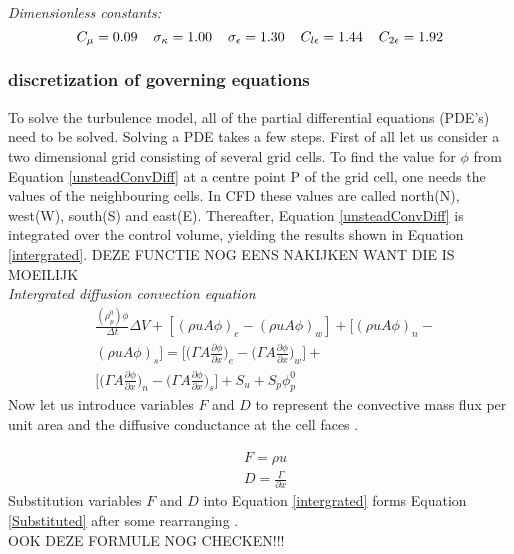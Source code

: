 \documentclass{CFD2017}
\begin{document}
\emph{Dimensionless constants:}
\begin{equation*}
\label{dimConst}
C_{\mu}=0.09 \hspace{4mm} \sigma_{\kappa}=1.00\hspace{4mm}\sigma_{\epsilon}=1.30\hspace{4mm}C_{l\epsilon}=1.44\hspace{4mm}C_{2\epsilon}=1.92
\end{equation*}


\subsubsection{discretization of governing equations}
To solve the turbulence model, all of the partial differential equations (PDE's) need to be solved. Solving a PDE takes a few steps. First of all let us consider a two dimensional grid consisting of several grid cells. To find the value for $\phi$ from Equation \ref{unsteadConvDiff} at a centre point P of the grid cell, one needs the values of the neighbouring cells. In CFD these values are called north(N), west(W), south(S) and east(E). Thereafter, Equation \ref{unsteadConvDiff} is integrated over the control volume, yielding the results shown in Equation \ref{intergrated}.\vspace{2mm}
DEZE FUNCTIE NOG EENS NAKIJKEN WANT DIE IS MOEILIJK\\
\emph{Intergrated diffusion convection equation}
\begin{equation}
\begin{split}
\label{intergrated}
&\frac{(\rho_p^0)\phi}{\Delta t}\Delta V +[(\rho u A \phi)_e -(\rho u A \phi)_w]+[(\rho u A \phi)_n -\\
&(\rho u A \phi)_s]=\bigg[\bigg(\Gamma A \frac{\partial \phi}{\partial x}\bigg)_e -\bigg(\Gamma A \frac{\partial \phi}{\partial x}\bigg)_w\bigg] +\\
&\bigg[\bigg(\Gamma A \frac{\partial \phi}{\partial x}\bigg)_n -\bigg(\Gamma A \frac{\partial \phi}{\partial x}\bigg)_s\bigg] + S_u + S_p\phi_p^0
\end{split}
\end{equation}
Now let us introduce variables $F$ and $D$ to represent the convective mass flux per unit area and the diffusive conductance at the cell faces \cite{Versteeg2007}.\vspace{2mm}

\begin{align}
&F = \rho u\\
&D=\frac{\Gamma}{\partial x}
\end{align}
Substitution variables $F$ and $D$ into Equation \ref{intergrated} forms Equation \ref{Substituted} after some rearranging \cite{Versteeg2007}. \\OOK DEZE FORMULE NOG CHECKEN!!!
\end{document}
